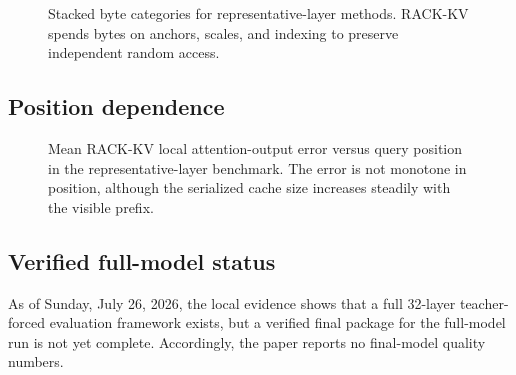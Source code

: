 \begin{figure}[h]
  \centering
  
  \caption{Stacked byte categories for representative-layer methods. RACK-KV spends bytes on anchors, scales, and indexing to preserve independent random access.}
  \label{fig:storagebreakdown}
\end{figure}

\subsection{Position dependence}

\begin{figure}[h]
  \centering
  
  \caption{Mean RACK-KV local attention-output error versus query position in the representative-layer benchmark. The error is not monotone in position, although the serialized cache size increases steadily with the visible prefix.}
  \label{fig:errorposition}
\end{figure}

\subsection{Verified full-model status}

As of Sunday, July 26, 2026, the local evidence shows that a full 32-layer teacher-forced evaluation framework exists, but a verified final package for the full-model run is not yet complete. Accordingly, the paper reports no final-model quality numbers.
